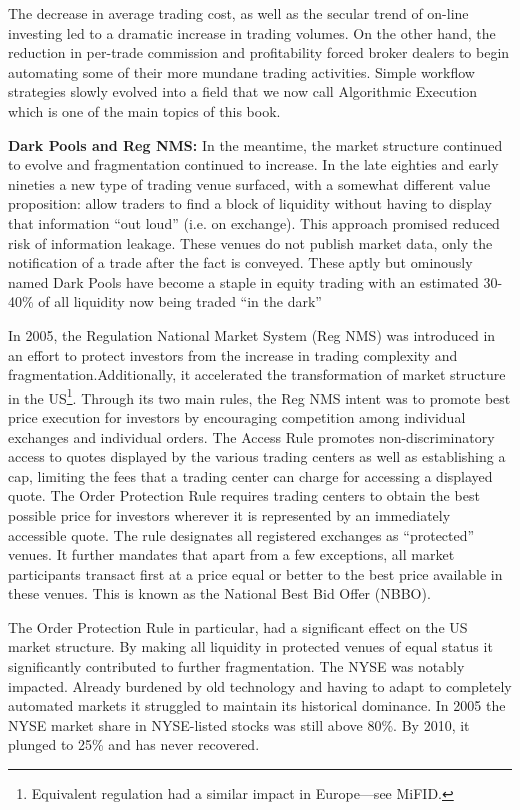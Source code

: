 The decrease in average trading cost, as well as the secular trend of on-line investing led to a dramatic increase in trading volumes. On the other hand, the reduction in per-trade commission and profitability forced broker dealers to begin automating some of their more mundane trading activities. Simple workflow strategies slowly evolved into a field that we now call Algorithmic Execution which is one of the main topics of this book. \twomedskip

\noindent\textbf{Dark Pools and Reg NMS:} In the meantime, the market structure continued to evolve and fragmentation continued to increase. In the late eighties and early nineties a new type of trading venue surfaced, with a somewhat different value proposition: allow traders to find a block of liquidity without  having to display that information ``out loud'' (i.e. on exchange). This approach promised reduced risk of information leakage. These venues do not publish market data, only the notification of a trade after the fact is conveyed.  These aptly but ominously named Dark Pools have become a staple in equity trading with an estimated 30-40\% of all liquidity now being traded ``in the dark'' \twomedskip

In 2005, the Regulation National Market System (Reg NMS) was introduced in an effort to protect investors from the increase in trading complexity and fragmentation.Additionally, it accelerated the transformation of market structure in the US\footnote{Equivalent regulation had a similar impact in Europe---see MiFID.}. Through its two main rules, the Reg NMS intent was to promote best price execution for investors by encouraging competition among individual exchanges and individual orders. The Access Rule promotes non-discriminatory access to quotes displayed by the various trading centers as well as establishing a cap, limiting the fees that a trading center can charge for accessing a displayed quote. The Order Protection Rule requires trading centers to obtain the best possible price for investors wherever it is represented by an immediately accessible quote. The rule designates all registered exchanges as ``protected'' venues. It further mandates that apart from a few exceptions, all market participants transact first at a price equal or better to the best price available in these venues. This is known as the National Best Bid Offer (NBBO). 

The Order Protection Rule in particular, had a significant effect on the US market structure. By making all liquidity in protected venues of equal status it significantly contributed to further fragmentation. The NYSE was notably impacted. Already burdened by old technology and having to adapt to completely automated markets it struggled to maintain its historical dominance. In 2005 the NYSE market share in NYSE-listed stocks was  still above 80\%. By 2010, it plunged to 25\% and has never recovered.

